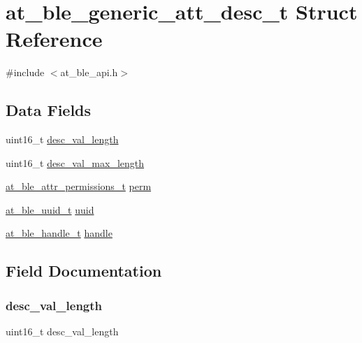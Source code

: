 \hypertarget{structat__ble__generic__att__desc__t}{}\section{at\+\_\+ble\+\_\+generic\+\_\+att\+\_\+desc\+\_\+t Struct Reference}
\label{structat__ble__generic__att__desc__t}


{\ttfamily \#include $<$at\+\_\+ble\+\_\+api.\+h$>$}

\subsection*{Data Fields}
\begin{DoxyCompactItemize}
\item 
uint16\+\_\+t \mbox{\hyperlink{structat__ble__generic__att__desc__t_a78194bc1c22a58c9b2c08cfaae02c242}{desc\+\_\+val\+\_\+length}}
\item 
uint16\+\_\+t \mbox{\hyperlink{structat__ble__generic__att__desc__t_a478d565af896d92ed41189230553b06f}{desc\+\_\+val\+\_\+max\+\_\+length}}
\item 
\mbox{\hyperlink{at__ble__api_8h_a5d87cd231ea3f9e11846dba7cf75eb61}{at\+\_\+ble\+\_\+attr\+\_\+permissions\+\_\+t}} \mbox{\hyperlink{structat__ble__generic__att__desc__t_a339b801a3a93cf9055c72ff39b60472a}{perm}}
\item 
\mbox{\hyperlink{structat__ble__uuid__t}{at\+\_\+ble\+\_\+uuid\+\_\+t}} \mbox{\hyperlink{structat__ble__generic__att__desc__t_a679a8e56540040619aee07eb7a743859}{uuid}}
\item 
\mbox{\hyperlink{at__ble__api_8h_abd23646d0c662860741f787efc8456f2}{at\+\_\+ble\+\_\+handle\+\_\+t}} \mbox{\hyperlink{structat__ble__generic__att__desc__t_ab8b0f353cb6a8d85f0822900e3b7cf35}{handle}}
\end{DoxyCompactItemize}


\subsection{Field Documentation}
\mbox{\label{structat__ble__generic__att__desc__t_a78194bc1c22a58c9b2c08cfaae02c242}} 
\subsubsection{\texorpdfstring{desc\_val\_length}{desc\_val\_length}}
{\footnotesize\ttfamily uint16\+\_\+t desc\+\_\+val\+\_\+length}

